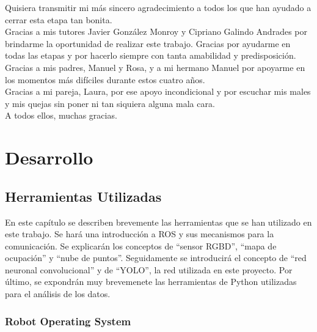 Quisiera transmitir mi más sincero agradecimiento a todos los que han ayudado a cerrar esta etapa tan bonita.\\

Gracias a mis tutores Javier González Monroy y Cipriano Galindo Andrades por brindarme la oportunidad de realizar este trabajo. Gracias por ayudarme en todas las etapas y por hacerlo siempre con tanta amabilidad y predisposición.\\

Gracias a mis padres, Manuel y Rosa, y a mi hermano Manuel por apoyarme en los momentos más difíciles durante estos cuatro años.\\

Gracias a mi pareja, Laura, por ese apoyo incondicional y por escuchar mis males y mis quejas sin poner ni tan siquiera alguna mala cara.\\

A todos ellos, muchas gracias.\\

\tableofcontents

\cleardoublepage
{} %
\listoffigures %

\cleardoublepage
{} %
\listoftables %



\part{Desarrollo}

\chapter{Herramientas Utilizadas}

En este capítulo se describen brevemente las herramientas que se han utilizado en este trabajo. Se hará una introducción a ROS y sus mecanismos para la comunicación. Se explicarán los conceptos de ``sensor RGBD'', ``mapa de ocupación'' y ``nube de puntos''. Seguidamente se introducirá el concepto de ``red neuronal convolucional'' y de ``YOLO'', la red utilizada en este proyecto. Por último, se expondrán muy brevemenete las herramientas de Python utilizadas para el análisis de los datos.\\

\section{Robot Operating System}

